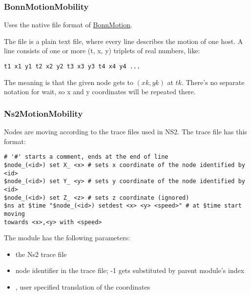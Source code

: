 \subsubsection*{BonnMotionMobility}

Uses the native file format of \href{http://bonnmotion.net}{BonnMotion}.

The file is a plain text file, where every line describes the motion
of one host. A line consists of one or more (t, x, y) triplets of real
numbers, like:

\begin{verbatim}
t1 x1 y1 t2 x2 y2 t3 x3 y3 t4 x4 y4 ...
\end{verbatim}

The meaning is that the given node gets to $(xk,yk)$ at $tk$. There's no
separate notation for wait, so x and y coordinates will be repeated there.

\subsubsection*{Ns2MotionMobility}

Nodes are moving according to the trace files used in NS2.
The trace file has this format:

\begin{verbatim}
# '#' starts a comment, ends at the end of line
$node_(<id>) set X_ <x> # sets x coordinate of the node identified by <id>
$node_(<id>) set Y_ <y> # sets y coordinate of the node identified by <id>
$node_(<id>) set Z_ <z> # sets z coordinate (ignored)
$ns at $time "$node_(<id>) setdest <x> <y> <speed>" # at $time start moving
towards <x>,<y> with <speed>
\end{verbatim}

The  module has the following parameters:

\begin{itemize}
  \item {} the Ns2 trace file
  \item {} node identifier in the trace file; -1 gets substituted by
  parent module's index
  \item {}, user specified translation of the
  coordinates
\end{itemize}


